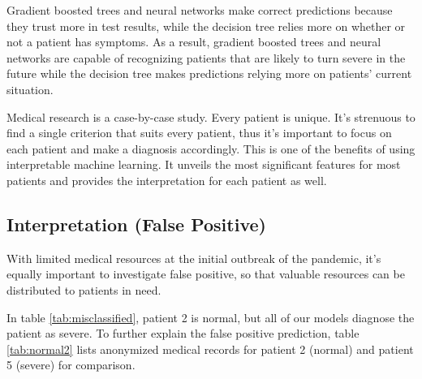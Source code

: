 Gradient boosted trees and neural networks make correct predictions because they trust more in test results, while the decision tree relies more on whether or not a patient has symptoms. As a result, gradient boosted trees and neural networks are capable of recognizing patients that are likely to turn severe in the future while the decision tree makes predictions relying more on patients' current situation.

Medical research is a case-by-case study. Every patient is unique. It's strenuous to find a single criterion that suits every patient, thus it's important to focus on each patient and make a diagnosis accordingly. This is one of the benefits of using interpretable machine learning. It unveils the most significant features for most patients and provides the interpretation for each patient as well.
\color{black}

\subsection{Interpretation (False Positive)}

With limited medical resources at the initial outbreak of the pandemic, it's equally important to investigate false positive, so that valuable resources can be distributed to patients in need.

In table \ref{tab:misclassified}, patient 2 is normal, but all of our models diagnose the patient as severe. To further explain the false positive prediction, table \ref{tab:normal2} lists anonymized medical records for patient 2 (normal) and patient 5 (severe) for comparison.

